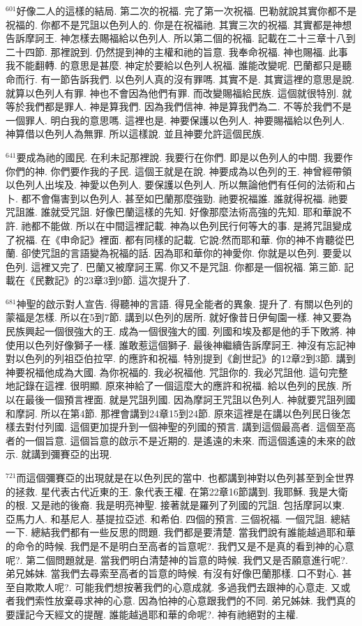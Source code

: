 \documentclass{book}
\begin{document}
$^{601}$好像二人的這樣的結局.
第二次的祝福.
完了第一次祝福.
巴勒就說其實你都不是祝福的.
你都不是咒詛以色列人的.
你是在祝福祂.
其實三次的祝福.
其實都是神想告訴摩訶王.
神怎樣去賜福給以色列人.
所以第二個的祝福.
記載在二十三章十八到二十四節.
那裡說到.
仍然提到神的主權和祂的旨意.
我奉命祝福.
神也賜福.
此事我不能翻轉.
的意思是甚麼.
神定於要給以色列人祝福.
誰能改變呢.
巴蘭都只是聽命而行.
有一節告訴我們.
以色列人真的沒有罪嗎.
其實不是.
其實這裡的意思是說.
就算以色列人有罪.
神也不會因為他們有罪.
而改變賜福給民族.
這個就很特別.
就等於我們都是罪人.
神是算我們.
因為我們信神.
神是算我們為二.
不等於我們不是一個罪人.
明白我的意思嗎.
這裡也是.
神要保護以色列人.
神要賜福給以色列人.
神算借以色列人為無罪.
所以這樣說.
並且神要允許這個民族.

$^{641}$要成為祂的國民.
在利未記那裡說.
我要行在你們.
即是以色列人的中間.
我要作你們的神.
你們要作我的子民.
這個王就是在說.
神要成為以色列的王.
神曾經帶領以色列人出埃及.
神愛以色列人.
要保護以色列人.
所以無論他們有任何的法術和占卜.
都不會傷害到以色列人.
甚至如巴蘭那麼強勁.
祂要祝福誰.
誰就得祝福.
祂要咒詛誰.
誰就受咒詛.
好像巴蘭這樣的先知.
好像那麼法術高強的先知.
耶和華說不許.
祂都不能做.
所以在中間這裡記載.
神為以色列民行何等大的事.
是將咒詛變成了祝福.
在《申命記》裡面.
都有同樣的記載.
它說:然而耶和華.
你的神不肯聽從巴蘭.
卻使咒詛的言語變為祝福的話.
因為耶和華你的神愛你.
你就是以色列.
要愛以色列.
這裡又完了.
巴蘭又被摩訶王罵.
你又不是咒詛.
你都是一個祝福.
第三節.
記載在《民數記》的23章3到9節.
這次提升了.

$^{681}$神聖的啟示對人宣告.
得聽神的言語.
得見全能者的異象.
提升了.
有關以色列的蒙福是怎樣.
所以在5到7節.
講到以色列的居所.
就好像昔日伊甸園一樣.
神又要為民族興起一個很強大的王.
成為一個很強大的國.
列國和埃及都是他的手下敗將.
神使用以色列好像獅子一樣.
誰敢惹這個獅子.
最後神繼續告訴摩訶王.
神沒有忘記神對以色列的列祖亞伯拉罕.
的應許和祝福.
特別提到《創世記》的12章2到3節.
講到神要祝福他成為大國.
為你祝福的.
我必祝福他.
咒詛你的.
我必咒詛他.
這句完整地記錄在這裡.
很明顯.
原來神給了一個這麼大的應許和祝福.
給以色列的民族.
所以在最後一個預言裡面.
就是咒詛列國.
因為摩訶王咒詛以色列人.
神就要咒詛列國和摩訶.
所以在第4節.
那裡會講到24章15到24節.
原來這裡是在講以色列民日後怎樣去對付列國.
這個更加提升到一個神聖的列國的預言.
講到這個最高者.
這個至高者的一個旨意.
這個旨意的啟示不是近期的.
是遙遠的未來.
而這個遙遠的未來的啟示.
就講到彌賽亞的出現.

$^{721}$而這個彌賽亞的出現就是在以色列民的當中.
也都講到神對以色列甚至到全世界的拯救.
星代表古代近東的王.
象代表王權.
在第22章16節講到.
我耶穌.
我是大衛的根.
又是祂的後裔.
我是明亮神聖.
接著就是羅列了列國的咒詛.
包括摩訶以東.
亞馬力人.
和基尼人.
基提拉亞述.
和希伯.
四個的預言.
三個祝福.
一個咒詛.
總結一下.
總結我們都有一些反思的問題.
我們都是要清楚.
當我們說有誰能越過耶和華的命令的時候.
我們是不是明白至高者的旨意呢?.
我們又是不是真的看到神的心意呢?.
第二個問題就是.
當我們明白清楚神的旨意的時候.
我們又是否願意進行呢?.
弟兄姊妹.
當我們去尋索至高者的旨意的時候.
有沒有好像巴蘭那樣.
口不對心.
甚至自欺欺人呢?.
可能我們想按著我們的心意成就.
多過我們去跟神的心意走.
又或者我們索性放棄尋求神的心意.
因為怕神的心意跟我們的不同.
弟兄姊妹.
我們真的要謹記今天經文的提醒.
誰能越過耶和華的命呢?.
神有祂絕對的主權.
\end{document}
